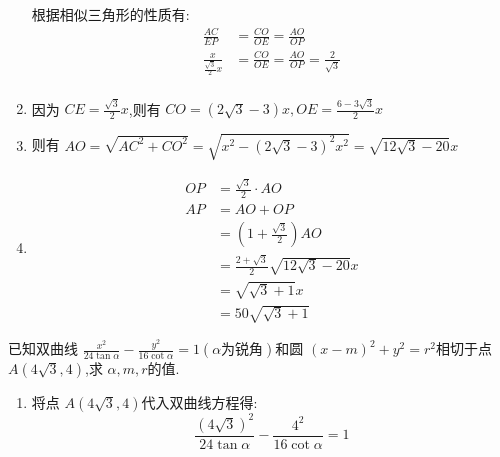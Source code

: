 \begin{questions}
\begin{solution}
\begin{enumerate}[label=\zhnum{*}、, noitemsep]
			      根据相似三角形的性质有:
			      \begin{align*}
				      \frac{AC}{EP}                 & = \frac{CO}{OE} = \frac{AO}{OP}                     \\
				      \frac{x}{\frac{\sqrt{3}}{2}x} & = \frac{CO}{OE} = \frac{AO}{OP}= \frac{2}{\sqrt{3}} \\
			      \end{align*}
			\item 因为 \( CE=\frac{\sqrt{3}}{2}x \),则有 \( CO = (2\sqrt{3} - 3)x, OE = \frac{6 - 3\sqrt{3}}{2}x \)
			\item 则有 \( AO = \sqrt{AC^2 + CO^2} = \sqrt{x^2 - (2\sqrt{3} - 3)^2x^2} = \sqrt{12\sqrt{3} - 20}x \)
			\item
			      \begin{align*}
				      OP & = \frac{\sqrt{3}}{2} \cdot AO               \\
				      AP & = AO + OP                                   \\
				         & = (1+\frac{\sqrt{3}}{2})AO                  \\
				         & = \frac{2+\sqrt{3}}{2}\sqrt{12\sqrt{3}-20}x \\
				         & = \sqrt{\sqrt{3} + 1}x                      \\
				         & = 50\sqrt{\sqrt{3} + 1}
			      \end{align*}

		\end{enumerate}
	\end{solution}

	\question 已知双曲线 \( \frac{x^2}{24\tan\alpha} - \frac{y^2}{16\cot\alpha} = 1 (\alpha\text{为锐角})\)和圆 \( (x-m)^2 +
	y^2 = r^2 \)相切于点 \( A(4\sqrt{3},4) \),求 \( \alpha, m, r \)的值.
	\begin{solution}
		\begin{enumerate}[label=\arabic*., noitemsep]
			\item 将点 	\( A(4\sqrt{3}, 4) \)代入双曲线方程得:
			      \begin{equation*}
				      \frac{(4\sqrt{3})^2}{24\tan\alpha} - \frac{4^2}{16\cot\alpha} = 1
			      \end{equation*}


\end{enumerate}
\end{solution}
\end{questions}
